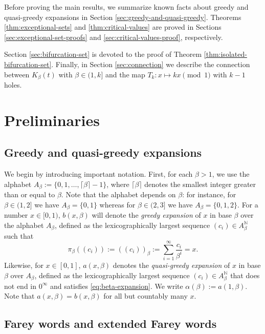 \documentclass[12pt]{amsart}
\theoremstyle{definition}
\theoremstyle{remark}
\numberwithin{equation}{section}
\newcommand{\N}{\ensuremath{\mathbb{N}}}
\newcommand{\f}{\infty}
\newcommand{\al}{\alpha}
\begin{document}
Before proving the main results, we summarize known facts about greedy and quasi-greedy expansions in Section \ref{sec:greedy-and-quasi-greedy}. Theorems \ref{thm:exceptional-sets} and \ref{thm:critical-values} are proved in Sections \ref{sec:exceptional-set-proofs} and \ref{sec:critical-values-proof}, respectively. {Section \ref{sec:bifurcation-set} is devoted to the proof of Theorem \ref{thm:isolated-bifurcation-set}. Finally, in Section \ref{sec:connection} we describe the connection between $K_\beta(t)$ with $\beta\in(1,k]$ and the map $T_k: x\mapsto kx\pmod 1$ with $k-1$ holes.



\section{Preliminaries} \label{sec:prelim}

\subsection{Greedy and quasi-greedy expansions}

We begin by introducing important notation. First, for each $\beta>1$, we use the alphabet $A_\beta:=\{0,1,\dots,\lceil\beta\rceil-1\}$, where $\lceil \beta\rceil$ denotes the smallest integer greater than or equal to $\beta$. Note that the alphabet depends on $\beta$: for instance, for $\beta\in(1,2]$ we have $A_\beta=\{0,1\}$ whereas for $\beta\in(2,3]$ we have $A_\beta=\{0,1,2\}$. For a number $x\in[0,1)$, $b(x,\beta)$ will denote the {\em greedy expansion} of $x$ in base $\beta$ over the alphabet $A_\beta$, defined as the lexicographically largest sequence $(c_i)\in A_\beta^\N$ such that
\begin{equation} \label{eq:beta-expansion}
\pi_\beta((c_i)):=((c_i))_\beta:=\sum_{i=1}^\f \frac{c_i}{\beta^i}=x.
\end{equation}
Likewise, for $x\in[0,1]$, $a(x,\beta)$ denotes the {\em quasi-greedy expansion} of $x$ in base $\beta$ over $A_\beta$, defined as the lexicographically largest sequence $(c_i)\in A_\beta^\N$ that does not end in $0^\f$ and satisfies \eqref{eq:beta-expansion}. We write $\al(\beta):=a(1,\beta)$. Note that $a(x,\beta)=b(x,\beta)$ for all but countably many $x$.


\subsection{Farey words and extended Farey words}

}
\end{document}
